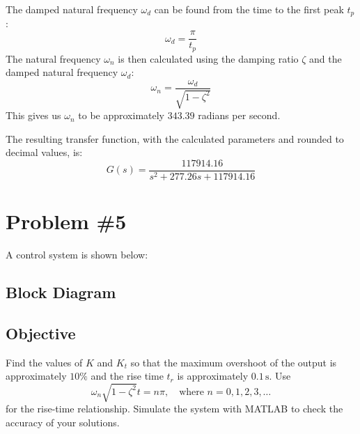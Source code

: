 \documentclass[11pt]{article}
\begin{document}
\noindent
The damped natural frequency \( \omega_d \) can be found from the time to the first peak \( t_p \):
\[
\omega_d = \frac{\pi}{t_p}
\]
The natural frequency \( \omega_n \) is then calculated using the damping ratio \( \zeta \) and the damped natural frequency \( \omega_d \):
\[
\omega_n = \frac{\omega_d}{\sqrt{1-\zeta^2}}
\]
This gives us \( \omega_n \) to be approximately \( 343.39 \) radians per second.

\noindent
The resulting transfer function, with the calculated parameters and rounded to decimal values, is:
\[
G(s) = \frac{117914.16}{s^2 + 277.26s + 117914.16}
\]





\newpage
\section*{Problem \#5}

A control system is shown below:
\subsection*{Block Diagram}

\begin{center}
\end{center}
\subsection*{Objective}
Find the values of \( K \) and \( K_t \) so that the maximum overshoot of the output is approximately \( 10\% \) and the rise time \( t_r \) is approximately \( 0.1 \, \text{s} \). Use 
\[
\omega_n \sqrt{1 - \zeta^2} t = n\pi, \quad \text{where } n = 0, 1, 2, 3, \ldots
\]
for the rise-time relationship.
\newline \newline
\noindent Simulate the system with MATLAB to check the accuracy of your solutions.
\newpage
\end{document}
